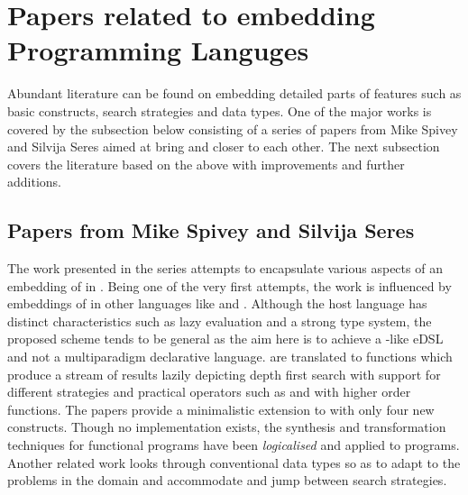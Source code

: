 \documentclass[thesis-solanki.tex]{subfiles}
\begin{document}
\section{Papers related to embedding Programming Languges}

Abundant literature can be found on embedding detailed parts of  features such as basic
constructs, search strategies and data types.
One of the major works is covered by the subsection below consisting of a series of papers from Mike Spivey and
Silvija Seres aimed at bring  and  closer to each other.
The next subsection covers the literature based on the above
with improvements and further additions.


\subsection{Papers from Mike Spivey and Silvija Seres}


The work presented in the series
\cite{spivey1999embedding,seres1999algebra,seres2001higher,spivey1999algebra,seres2001algebra} attempts to
encapsulate various aspects of an embedding of  in .
Being one of the very first attempts, the work is influenced by embeddings of 
in other languages like  and .
Although the host language has distinct characteristics such as lazy evaluation and a strong type system, the proposed
scheme tends to be general as the aim here is to achieve a -like eDSL and not a multiparadigm
declarative language.
  are translated to  functions which produce a
stream of results lazily depicting depth first search with support for different strategies and practical operators
such as  and  with higher order functions.
The papers provide a minimalistic extension to  with only four new constructs.
Though no implementation exists, the synthesis and transformation techniques for functional programs have been
\textit{logicalised} and applied to  programs.
Another related work \cite{spivey2000functional} looks through conventional data types so as to adapt to the
problems in the domain and accommodate and jump between search strategies.
\end{document}
